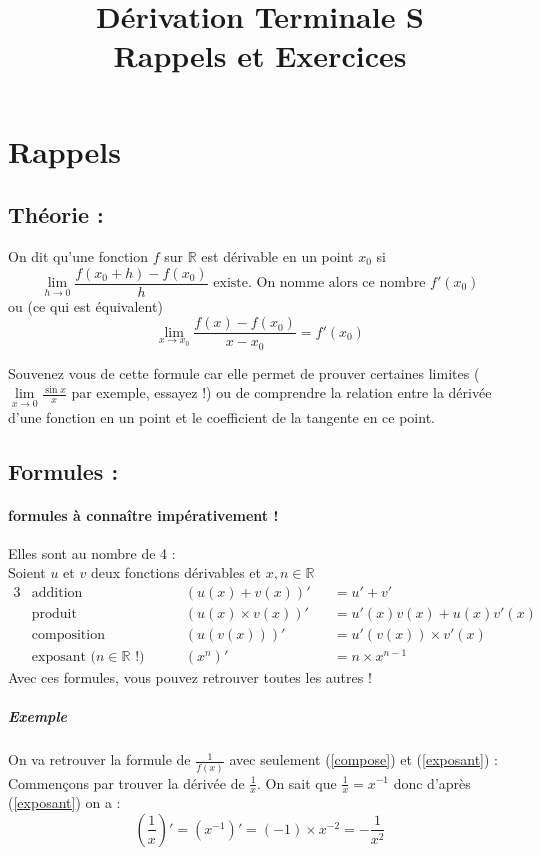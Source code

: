\documentclass[11pt]{article}
\title{Dérivation Terminale S\\
        \large Rappels et Exercices}
\date{}
\author{}
\newcommand{\R}{\mathbb R}
\newcommand{\de}[1]{\left(#1\right)'}
\begin{document}
    
    \maketitle
    
    \section{Rappels}
        \subsection{Théorie :}
        On dit qu'une fonction $f$ sur $\R$ est dérivable en un point $x_0$ si
        \begin{equation}
            \lim\limits_{h \to 0} \frac{f(x_0 + h)-f(x_0)}{h} \text{ existe. On nomme alors ce nombre $f'(x_0)$} 
        \end{equation}
        ou (ce qui est équivalent)
        \begin{equation*}
            \lim\limits_{x \to x_0} \frac{f(x)-f(x_0)}{x-x_0} = f'(x_0)            
        \end{equation*}

        Souvenez vous de cette formule car elle permet de prouver certaines limites ($\lim\limits_{x \to 0} \frac{\sin{x}}{x}$ par exemple, essayez !) ou de comprendre la relation entre la dérivée d'une fonction en un point et le coefficient de la tangente en ce point.

        \subsection{Formules :}
        \paragraph{formules à connaître impérativement !}
        Elles sont au nombre de 4 : \\Soient $u$ et $v$ deux fonctions dérivables et $x,n \in  \R $
        \begin{alignat}{3}
            &\text{addition} &\qquad& (u(x) + v(x))'&& = u'+v' \label{addition} \\
            &\text{produit} && (u(x) \times v(x))'&& = u'(x)v(x) + u(x)v'(x) \label{produit}\\
            &\text{composition} && (u(v(x)))'&& = u'(v(x)) \times v'(x) \label{compose}\\
            &\text{exposant ($n\in \R$ !)} && (x^n)'&& = n \times x^{n-1} \label{exposant}
        \end{alignat}
        Avec ces formules, vous pouvez retrouver toutes les autres !
        \subparagraph{Exemple} On va retrouver la formule de $\frac{1}{f(x)}$ avec seulement (\ref{compose}) et (\ref{exposant}) :\\
            Commençons par trouver la dérivée de $\frac{1}{x}$.
            On sait que $\frac{1}{x}=x^{-1}$ donc d'après (\ref{exposant}) on a :
            \begin{equation*}
                \de{\frac{1}{x}}=\de{x^{-1}}=(-1)\times x^{-2} = -\frac{1}{x^2}
            \end{equation*}
\end{document}
